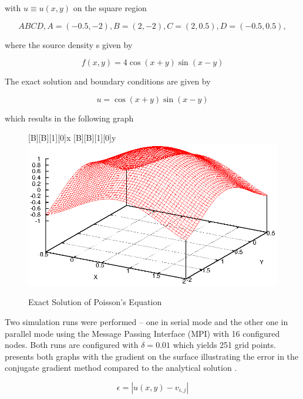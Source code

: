 \documentclass[12pt,a4paper]{report}
\begin{document}
with $u\equiv u(x,y)$ on the square region

\begin{equation}
  \label{eq:squareRegion}
  ABCD, A=(-0.5,-2), B=(2,-2), C=(2,0.5), D=(-0.5,0.5),
\end{equation}

where the source density s given by

\begin{equation}
  \label{eq:sourceDensity}
  f(x,y)=4\cos(x+y)\sin(x-y)
\end{equation}

The exact solution and boundary conditions are given by

\begin{equation}
  \label{eq:boundaryCond}
  u=\cos(x+y)\sin(x-y)
\end{equation}

which results in the following graph

\begin{figure}[htb]
  \centering
  [B][B][1][0]{x}
  [B][B][1][0]{y}
  \includegraphics[scale=0.5]{./images/exact.eps}
  \caption{Exact Solution of Poisson's Equation}
  \label{fig:exactPoiss}
\end{figure}

Two simulation runs were performed -- one in serial mode and the other
one in parallel mode using the Message Passing Interface (MPI) with 16
configured nodes. Both runs are configured with $\delta=0.01$ which
yields 251 grid points.  presents both
graphs with the gradient on the surface illustrating the error
 in the conjugate gradient method compared to the
analytical solution .

\begin{equation}
  \label{eq:error}
  \epsilon=|u(x,y)-v_{i,j}|
\end{equation}
\end{document}
